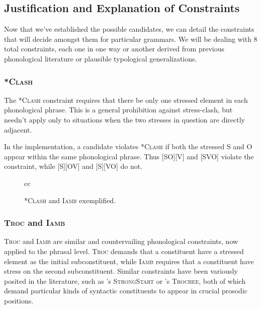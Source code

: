 \documentclass{article}
\newcommand{\noclash}{\textsc{*Clash}}
\newcommand{\iamb}{\textsc{Iamb}}
\newcommand{\troc}{\textsc{Troc}}
\begin{document}
\subsection{Justification and Explanation of Constraints\label{straints}}

Now that we've established the possible candidates, we can detail the constraints that will decide amongst them for particular grammars.
We will be dealing with 8 total constraints, each one in one way or another derived from previous phonological literature or plausible typological generalizations.

\subsubsection{\noclash}

The {\noclash} constraint requires that there be only one stressed element in each phonological phrase.
This is a general prohibition against stress-clash, but needn't apply only to situations when the two stresses in question are directly adjacent.

In the implementation, a candidate violates {\noclash} if both the stressed S and O appear within the same phonological phrase.
Thus [SO][V] and [SVO] violate the constraint, while [S][OV] and [S][VO] do not.

\begin{figure}
\begin{center}
\begin{tableau}{cc}
		\const{\noclash}	\const{\iamb}
	\cand[\Optimal]{[S][OV]} \vio{}		\vio{}
	\cand{[S][VO]} \vio{}		\vio{*!}
	\cand{[SO][V]} \vio{*!}\vio{}
	\cand{[SOV]} \vio{*!}\vio{}
	\cand{[SVO]} \vio{*!}	\vio{*}
\end{tableau}
\end{center}
	\caption{\noclash{} and {\iamb} exemplified.}
\end{figure}

\subsubsection{{\troc} and {\iamb}}

{\troc} and {\iamb} are similar and countervailing phonological constraints, now applied to the phrasal level.
{\troc} demands that a constituent have a stressed element as the initial subconstituent,
while {\iamb} requires that a constituent have stress on the second subconstituent.
Similar constraints have been variously posited in the literature, such as \textcite{selkirk11}'s \textsc{StrongStart} or \textcite{fitzgerald94}'s \textsc{Trochee}, both of which demand particular kinds of syntactic constituents to appear in crucial prosodic positions.
\end{document}
